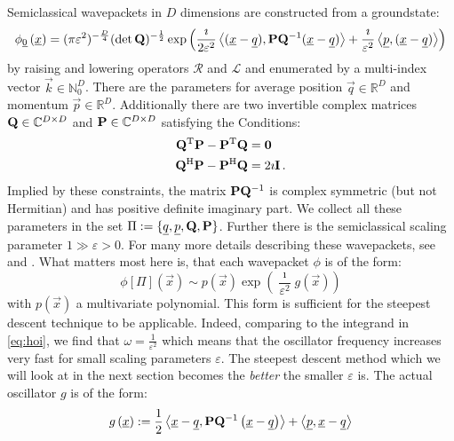 \documentclass[a4paper,10pt]{article}
\begin{document}
Semiclassical wavepackets in $D$ dimensions are constructed from a groundstate:
\begin{align*}
  \phi_{\underline{0}}\left(\underline{x}\right)
  =
  (\pi\varepsilon^2)^{-\frac{D}{4}} (\det\mathbf{Q})^{-\frac{1}{2}}
  \exp \left( \frac{\imath}{2\varepsilon^2}
  \left\langle (\underline{x}-\underline{q}) , \mathbf{P}\mathbf{Q}{}^{-1}(\underline{x}-\underline{q}) \right\rangle
  + \frac{\imath}{\varepsilon^2} \left\langle \underline{p} , (\underline{x}-\underline{q}) \right\rangle
  \right)
\end{align*}
by raising and lowering operators $\mathcal{R}$ and $\mathcal{L}$
and enumerated by a multi-index vector $\vec{k} \in \mathbb{N}_0^D$.
There are the parameters for average position $\vec{q} \in \mathbb{R}^D$
and momentum $\vec{p} \in \mathbb{R}^D$. Additionally there are two invertible
complex matrices $\mathbf{Q} \in \mathbb{C}^{D \times D}$ and $\mathbf{P} \in \mathbb{C}^{D \times D}$
satisfying the Conditions:
\begin{align}
  \mathbf{Q}{}^{\textnormal{T}}\mathbf{P} - \mathbf{P}{}^{\textnormal{T}}\mathbf{Q} &= \mathbf{0} \\
  \mathbf{Q}{}^{\textnormal{H}}\mathbf{P} - \mathbf{P}{}^{\textnormal{H}}\mathbf{Q} &= 2\imath\mathbf{I} \,.
\end{align}
Implied by these constraints, the matrix $\mathbf{P}\mathbf{Q}{}^{-1}$ is complex symmetric
(but not Hermitian) and has positive definite imaginary part.
We collect all these parameters in the set $\Pi := \{\underline{q}, \underline{p}, \mathbf{Q}, \mathbf{P}\}$.
Further there is the semiclassical scaling parameter $1 \gg \varepsilon > 0$.
For many more details describing these wavepackets, see \cite{H_ladder_operators}
and \cite{B_master_thesis}.
What matters most here is, that each wavepacket $\phi$ is of the form:
\begin{equation}
  \phi[\Pi](\vec{x}) \sim p\left(\vec{x}\right)
                          \exp\left(\frac{\imath}{\varepsilon^2} g\left(\vec{x}\right)\right)
\end{equation}
with $p(\vec{x})$ a multivariate polynomial.
This form is sufficient for the steepest descent technique to be applicable.
Indeed, comparing to the integrand in \eqref{eq:hoi},
we find that $\omega = \frac{1}{\varepsilon^2}$ which means that the oscillator
frequency increases very fast for small scaling parameters $\varepsilon$.
The steepest descent method which we will look at in the next section becomes
the \emph{better} the smaller $\varepsilon$ is. The actual oscillator $g$ is of the form:
\begin{equation}
  g\left(\underline{x}\right)
  :=
  \frac{1}{2} \left\langle \underline{x}-\underline{q} , \mathbf{P}\mathbf{Q}{}^{-1} \left(\underline{x}-\underline{q}\right) \right\rangle
  +
  \left\langle \underline{p} , \underline{x}-\underline{q} \right\rangle
\end{equation}
\end{document}
